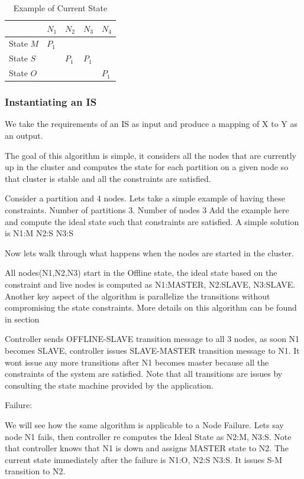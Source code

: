 {\begin{table}
\centering
\begin{tabular}{|l|l|l|l|l|} \hline \hline
            & \(N_1\) & \(N_2\) & \(N_3\) & \(N_4\) \\ \hline \hline
State \(M\)       & \(P_1\)  &         &         & \\ \hline 
State \(S\)       &         & \(P_1\) & \(P_1\) & \\ \hline 
State \(O\)       &         &         &         & \(P_1\) \\ \hline 
\end{tabular}
\label{CS_Example}
\caption{Example of Current State}
\end{table}

\subsubsection{Instantiating an IS}
We take the requirements of an IS as input and produce a mapping of X to
Y as an output.

The goal of this algorithm is simple, it
considers all the nodes that are currently up in the cluster and
computes the state for each partition on a given node so that cluster
is stable and all the constraints are satisfied.


Consider a partition and 4 nodes. 
Lets take a simple example of having these constraints.  Number of
partitions 3. Number of nodes 3 Add the example here and compute the
ideal state such that constraints are satisfied. A simple solution is
N1:M N2:S N3:S

Now lets walk through what happens when the nodes are started in the
cluster.

All nodes(N1,N2,N3) start in the Offline state, the ideal state based
on the constraint and live nodes is computed as N1:MASTER, N2:SLAVE,
N3:SLAVE. Another key aspect of the algorithm is parallelize the
transitions without compromising the state constraints. More details
on this algorithm can be found in section

Controller sends OFFLINE-SLAVE transition message to all 3 nodes, as
soon N1 becomes SLAVE, controller issues SLAVE-MASTER transition
message to N1. It wont issue any more transitions after N1 becomes
master because all the constraints of the system are satisfied. Note
that all transitions are issues by consulting the state machine
provided by the application.

Failure:

We will see how the same algorithm is applicable to a Node Failure.
Lets say node N1 fails, then controller re computes the Ideal State as
N2:M, N3:S. Note that controller knows that N1 is down and assigns
MASTER state to N2.  The current state immediately after the failure
is N1:O, N2:S N3:S. It issues S-M transition to N2.

}
